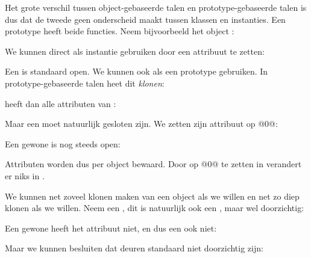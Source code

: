 Het grote verschil tussen object-gebaseerde talen en prototype-gebaseerde talen is dus dat de tweede geen onderscheid maakt tussen klassen en instanties. Een prototype heeft beide functies. Neem bijvoorbeeld het object :

\newCodeFragment


We kunnen  direct als instantie gebruiken door een attribuut te zetten:


Een  is standaard open. We kunnen  ook als een prototype gebruiken. In prototype-gebaseerde talen heet dit \emph{klonen}:


 heeft dan alle attributen van :


Maar een  moet natuurlijk gesloten zijn. We zetten zijn attribuut  op @0@:


Een gewone  is nog steeds open:


Attributen worden dus per object bewaard. Door  op @0@ te zetten in  verandert er niks in .

We kunnen net zoveel klonen maken van een object als we willen en net zo diep klonen als we willen. Neem een , dit is natuurlijk ook een , maar wel doorzichtig:


Een gewone  heeft het attribuut  niet, en dus een  ook niet:


Maar we kunnen besluiten dat deuren standaard niet doorzichtig zijn:


